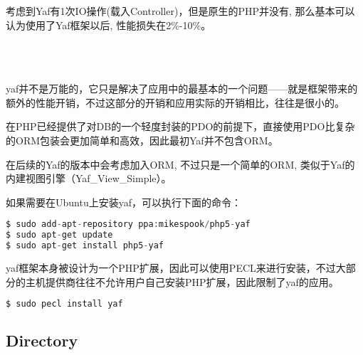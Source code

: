 考虑到Yaf有1次IO操作(载入Controller)，但是原生的PHP并没有, 那么基本可以认为使用了Yaf框架以后, 性能损失在2\%-10\%。




\begin{lstlisting}[language=PHP]

\end{lstlisting}



\begin{lstlisting}[language=PHP]

\end{lstlisting}



\begin{lstlisting}[language=PHP]

\end{lstlisting}



\begin{lstlisting}[language=PHP]

\end{lstlisting}





yaf并不是万能的，它只是解决了应用中的最基本的一个问题——就是框架带来的额外的性能开销，不过这部分的开销和应用实际的开销相比，往往是很小的。

在PHP已经提供了对DB的一个轻度封装的PDO的前提下，直接使用PDO比复杂的ORM包装会更加简单和高效，因此最初Yaf并不包含ORM。

在后续的Yaf的版本中会考虑加入ORM, 不过只是一个简单的ORM, 类似于Yaf的内建视图引擎（Yaf\_View\_Simple）。



如果需要在Ubuntu上安装yaf，可以执行下面的命令：


\begin{lstlisting}[language=PHP]
$ sudo add-apt-repository ppa:mikespook/php5-yaf
$ sudo apt-get update
$ sudo apt-get install php5-yaf
\end{lstlisting}

yaf框架本身被设计为一个PHP扩展，因此可以使用PECL来进行安装，不过大部分的主机提供商往往不允许用户自己安装PHP扩展，因此限制了yaf的应用。

\begin{lstlisting}[language=PHP]
$ sudo pecl install yaf
\end{lstlisting}




\subsection{Directory}


